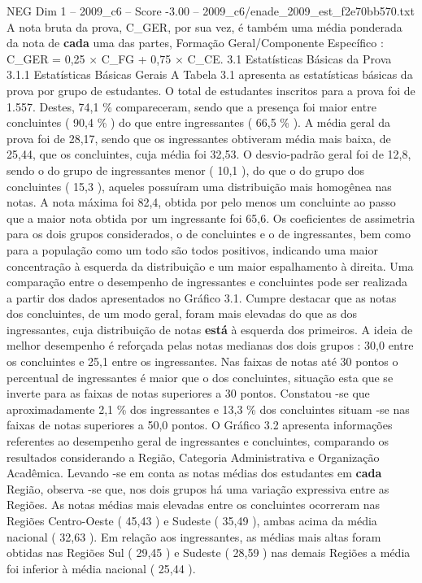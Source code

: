 \begin{textsample}{NEG Dim 1 – 2009\_c6 – Score -3.00 – 2009\_c6/enade\_2009\_est\_f2e70bb570.txt}
A nota bruta da prova, C\_GER, por sua vez, é também uma média ponderada da nota de \textbf{cada} uma das partes, Formação Geral/Componente Específico : C\_GER = 0,25 × C\_FG + 0,75 × C\_CE. 3.1 Estatísticas Básicas da Prova 3.1.1 Estatísticas Básicas Gerais A Tabela 3.1 apresenta as estatísticas básicas da prova por grupo de estudantes.
O total de estudantes inscritos para a prova foi de 1.557.
Destes, 74,1 \% compareceram, sendo que a presença foi maior entre concluintes ( 90,4 \% ) do que entre ingressantes ( 66,5 \% ).
A média geral da prova foi de 28,17, sendo que os ingressantes obtiveram média mais baixa, de 25,44, que os concluintes, cuja média foi 32,53.
O desvio-padrão geral foi de 12,8, sendo o do grupo de ingressantes menor ( 10,1 ), do que o do grupo dos concluintes ( 15,3 ), aqueles possuíram uma distribuição mais homogênea nas notas.
A nota máxima foi 82,4, obtida por pelo menos um concluinte ao passo que a maior nota obtida por um ingressante foi 65,6.
Os coeficientes de assimetria para os dois grupos considerados, o de concluintes e o de ingressantes, bem como para a população como um todo são todos positivos, indicando uma maior concentração à esquerda da distribuição e um maior espalhamento à direita.
Uma comparação entre o desempenho de ingressantes e concluintes pode ser realizada a partir dos dados apresentados no Gráfico 3.1.
Cumpre destacar que as notas dos concluintes, de um modo geral, foram mais elevadas do que as dos ingressantes, cuja distribuição de notas \textbf{está} à esquerda dos primeiros.
A ideia de melhor desempenho é reforçada pelas notas medianas dos dois grupos : 30,0 entre os concluintes e 25,1 entre os ingressantes.
Nas faixas de notas até 30 pontos o percentual de ingressantes é maior que o dos concluintes, situação esta que se inverte para as faixas de notas superiores a 30 pontos.
Constatou -se que aproximadamente 2,1 \% dos ingressantes e 13,3 \% dos concluintes situam -se nas faixas de notas superiores a 50,0 pontos.
O Gráfico 3.2 apresenta informações referentes ao desempenho geral de ingressantes e concluintes, comparando os resultados considerando a Região, Categoria Administrativa e Organização Acadêmica.
Levando -se em conta as notas médias dos estudantes em \textbf{cada} Região, observa -se que, nos dois grupos há uma variação expressiva entre as Regiões.
As notas médias mais elevadas entre os concluintes ocorreram nas Regiões Centro-Oeste ( 45,43 ) e Sudeste ( 35,49 ), ambas acima da média nacional ( 32,63 ).
Em relação aos ingressantes, as médias mais altas foram obtidas nas Regiões Sul ( 29,45 ) e Sudeste ( 28,59 ) nas demais Regiões a média foi inferior à média nacional ( 25,44 ).

\end{textsample}
